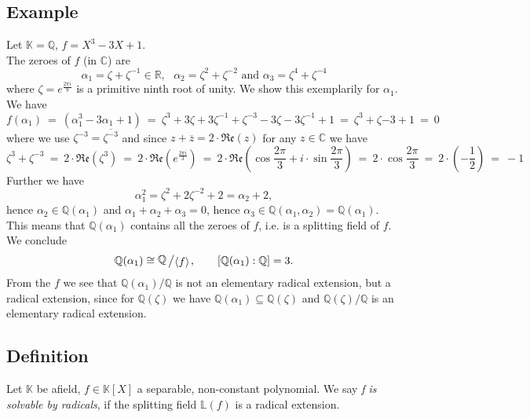 \documentclass[12pt]{book}
\newcommand{\slant}[2]{{\raisebox{.1em}{$#1$}\left/\raisebox{-.1em}{$#2$}\right.}}
\begin{document}
\begin{spacing}{1.3}
\subsection{Example} %
Let $\mathbb{K}=\mathbb{Q}$, $f=X^3-3X+1$.\\
The zeroes of $f$ (in $\mathbb{C}$) are 
$$ \alpha_1= \zeta + \zeta^{-1} \in \mathbb{R}, \textrm{ }\alpha_2=\zeta^2 + \zeta^{-2}\textrm{ and }\alpha_3=\zeta^4 + \zeta^{-4}$$
where $\zeta = e^{\frac{2\pi i}{9}}$ is a primitive ninth root of unity. We show this exemplarily for $\alpha_1$. We have
$$f(\alpha_1)\ =\ \left(\alpha_1^3-3 \alpha_1+1\right)\ =\ \zeta^3+ 3\zeta + 3\zeta^{-1}+\zeta^{-3} -3 \zeta - 3\zeta^{-1}+1\ =\ \zeta^3+ \zeta{-3}+1\ =\ 0$$
where we use $\zeta^{-3}= \overline{\zeta^{-3}}$ and since $z+\overline{z}=2 \cdot \mathfrak{Re}(z)$ for any $z \in \mathbb{C}$ we have
$$\zeta^3+ \zeta^{-3}\ =\ 2 \cdot \mathfrak{Re}\left(\zeta^3\right)\ =\ 2 \cdot \mathfrak{Re} \left(e^{\frac{2 \pi i}{3}}\right)\ =\ 2 \cdot \mathfrak{Re} \left(\cos\frac{2 \pi}{3} + i \cdot \sin \frac{2 \pi}{3}\right)\ 
=\ 2 \cdot \cos\frac{2 \pi}{3} \ =\ 2 \cdot \left(- \frac{1}{2}\right)\ =\ -1$$
Further we have $$\alpha_1^2=\zeta^2 + 2 \zeta^{-2}+2=\alpha_2+2,$$hence $\alpha_2 \in \mathbb{Q}(\alpha_1)$ and $\alpha_1 + \alpha_2 + \alpha_3 =0$, hence $\alpha_3 \in \mathbb{Q}(\alpha_1, \alpha_2) = \mathbb{Q}(\alpha_1)$.\\
This means that $\mathbb{Q}(\alpha_1)$ contains all the zeroes of $f$, i.e. is a splitting field of $f$.
We conclude $$\mathbb{Q}(\alpha_1) \cong \slant{\mathbb{Q}}{\langle f \rangle}, \qquad [\mathbb{Q}(\alpha_1):\mathbb{Q}]=3.$$
From the $f$ we see that $\mathbb{Q}(\alpha_1)/\mathbb{Q}$ is not an elementary radical extension, but a radical extension, since for $\mathbb{Q}(\zeta)$ we have $\mathbb{Q}(\alpha_1) \subseteq \mathbb{Q}(\zeta)$ and $\mathbb{Q}(\zeta)/\mathbb{Q}$ is an elementary radical extension. 

\subsection{Definition} %
Let $\mathbb{K}$ be afield, $f \in \mathbb{K}[X]$ a separable, non-constant polynomial. We say \textit{f is solvable by radicals}, if the splitting field $\mathbb{L}(f)$ is a radical extension.


\end{spacing}
\end{document}

